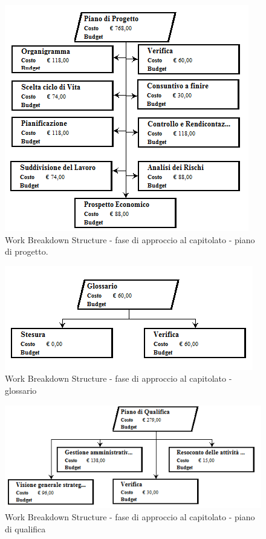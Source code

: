 \documentclass[a4paper]{article}
\begin{document}
				\begin{figure}[H]
					\centering
					\includegraphics[width=\textwidth]{wbs/wbs_approccio_4}
					\caption{Work Breakdown Structure - fase di approccio al capitolato - piano di progetto.}
				\end{figure}
				\begin{figure}[H]
					\centering
					\includegraphics[width=\textwidth]{wbs/wbs_approccio_5}
					\caption{Work Breakdown Structure - fase di approccio al capitolato - glossario}
				\end{figure}
				\begin{figure}[H]
					\centering
					\includegraphics[width=\textwidth]{wbs/wbs_approccio_6}
					\caption{Work Breakdown Structure - fase di approccio al capitolato - piano di qualifica}
				\end{figure}
\end{document}
